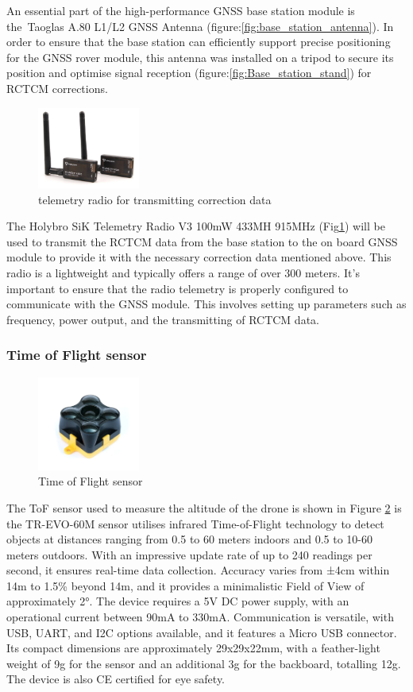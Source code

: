 \documentclass{article}
\begin{document}
An essential part of the high-performance GNSS base station module is the Taoglas A.80 L1/L2 GNSS Antenna (figure:\ref{fig:base_station_antenna}). In order to ensure that the base station can efficiently support precise positioning for the GNSS rover module, this antenna was installed on a tripod to secure its position and optimise signal reception (figure:\ref{fig:Base_station_stand}) for RCTCM corrections. 
\begin{figure}[H]
  \centering
  \includegraphics[width=0.3\textwidth]{Pictures/telemetry radio.png}
  \caption{telemetry radio for transmitting correction data}
  \label{fig:telemetry_radio}
\end{figure}
The Holybro SiK Telemetry Radio V3 100mW 433MH 915MHz (Fig\ref{fig:telemetry_radio}) will be used to transmit the RCTCM data from the base station to the on board GNSS module to provide it with the necessary correction data mentioned above. This radio is a lightweight and typically offers a range of over 300 meters. 
It's important to ensure that the radio telemetry is properly configured to communicate with the GNSS module. This involves setting up parameters such as frequency, power output, and the transmitting of RCTCM data.

\subsubsection{Time of Flight sensor}
\begin{figure}[H]
  \centering
  \includegraphics[width=0.3\textwidth]{Pictures/ToF_sensor.png}
  \caption{Time of Flight sensor}
  \label{fig:ToF}
\end{figure}
The ToF sensor used to measure the altitude of the drone is shown in Figure \ref{fig:ToF} is the TR-EVO-60M sensor utilises infrared Time-of-Flight technology to detect objects at distances ranging from 0.5 to 60 meters indoors and 0.5 to 10-60 meters outdoors. With an impressive update rate of up to 240 readings per second, it ensures real-time data collection. Accuracy varies from ±4cm within 14m to 1.5\%
beyond 14m, and it provides a minimalistic Field of View of approximately 2°. The device requires a 5V DC power supply, with an operational current between 90mA to 330mA. Communication is versatile, with USB, UART, and I2C options available, and it features a Micro USB connector. Its compact dimensions are approximately 29x29x22mm, with a feather-light weight of 9g for the sensor and an additional 3g for 
the backboard, totalling 12g. The device is also CE certified for eye safety.
\end{document}
